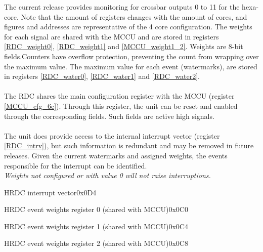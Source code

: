 The current release provides monitoring for crossbar outputs 0 to 11 for the hexa-core. Note that the amount of registers changes with the amount of cores, and figures and addresses are representative of the 4 core configuration. The weights for each signal are shared with the MCCU and are stored in registers \ref{RDC_weight0}, \ref{RDC_weight1} and \ref{MCCU_weight1_2}. Weights are 8-bit fields.Counters have overflow protection, preventing the count from wrapping over the maximum value.  The maximum value for each event (watermarks), are stored in registers \ref{RDC_water0}, \ref{RDC_water1} and \ref{RDC_water2}.\\
\\
The RDC shares the main configuration register with the MCCU (register \ref{MCCU_cfg_6c}). Through this register, the unit can be reset and enabled through the corresponding fields. Such fields are active high signals. \\
\\
The unit does provide access to the internal interrupt vector (register \ref{RDC_intrv}), but such information is redundant and may be removed in future releases. Given the current watermarks and assigned weights, the events responsible for the interrupt can be identified.
\\
\textit{Weights not configured or with value 0 will not raise interruptions.}


\begin{register}{H}{RDC interrupt vector}{0x0D4}
	\label{RDC_intrv}
	\regnewline
\end{register}
\begin{register}{H}{RDC event weights register 0 (shared with MCCU)}{0x0C0}
	\label{RDC_weight0}
	\regnewline
\end{register}
\begin{register}{H}{RDC event weights register 1 (shared with MCCU)}{0x0C4}
	\label{RDC_weight1}
	\regnewline
\end{register}
\begin{register}{H}{RDC event weights register 2 (shared with MCCU)}{0x0C8}
	\label{MCCU_weight1_2}
	\regnewline
\end{register}



